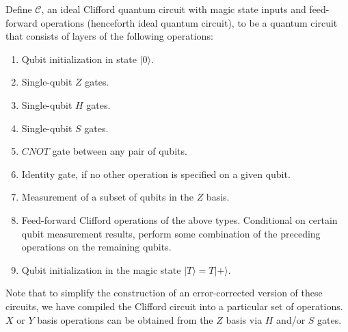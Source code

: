 \begin{definition}
\label{def:ideal_circuit}
Define $\mathcal{C}$, an ideal Clifford quantum circuit with magic state inputs and feed-forward operations (henceforth ideal quantum circuit), to be a quantum circuit that consists of layers of the following operations:
\begin{enumerate}
\item Qubit initialization in state $|0\rangle$.
\item Single-qubit $Z$ gates.
\item Single-qubit $H$ gates.
\item Single-qubit $S$ gates.
\item $CNOT$ gate between any pair of qubits.
\item Identity gate, if no other operation is specified on a given qubit.
\item Measurement of a subset of qubits in the $Z$ basis.
\item Feed-forward Clifford operations of the above types. Conditional on certain qubit measurement results, perform some combination of the preceding operations on the remaining qubits.
\item Qubit initialization in the magic state $|T\rangle=T|+\rangle$.
\end{enumerate}
\end{definition}
Note that to simplify the construction of an error-corrected version of these circuits, we have compiled the Clifford circuit into a particular set of operations.
%
$X$ or $Y$ basis operations can be obtained from the $Z$ basis via $H$ and/or $S$ gates.

